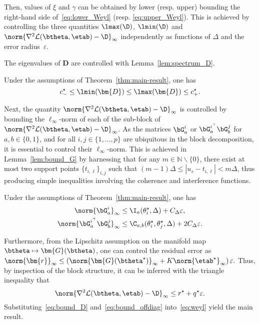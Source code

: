 \documentclass[conference,english,final,svgnames]{IEEEtran}
\begin{document}
Then, values of $\xi$ and $\gamma$ can be obtained by lower (resp. upper) bounding the right-hand side of~\eqref{eq:lower_Weyl} (resp. \eqref{eq:upper_Weyl}). This is achieved by controlling the three quantities $\lmax(\D)$, $\lmin(\D)$ and $\norm{\nabla^2 \mathcal{L}(\btheta, \etab) - \D}_{\infty}$ independently as functions of $\Delta$ and the error radius~$\varepsilon$.


The eigenvalues of $\bm{D}$ are controlled with Lemma~\ref{lem:spectrum_D}.
\begin{lemma}\label{lem:spectrum_D}
Under the assumptions of Theorem~\ref{thm:main-result}, one has
\begin{equation}\label{eq:bound_D}
        c_-^\star \leq \lmin(\bm{D}) \leq \lmax(\bm{D})  \leq c_+^\star.
\end{equation}
\end{lemma}
Next, the quantity $\norm{\nabla^2 \mathcal{L}(\btheta, \etab) - \D}_{\infty}$ is controlled by bounding the $\ell_{\infty}$-norm of each of the sub-block of $\norm{\nabla^2 \mathcal{L}(\btheta, \etab) - \D}_{\infty}$. As the matrices $\bG^i_a$ or $\bG_a^{i^{\top}}\bG_b^j$ for $a,b \in \{0,1\}$, and for all $i,j \in \{1,\dots, p\}$ are ubiquitous in the block decomposition, it is essential to control their $\ell_\infty$-norm. This is achieved in Lemma~\ref{lem:bound_G} by harnessing that for any $m\in \mathbb{N}\backslash\{0\}$, there exist at most two support points $\{t_{i,\ell}\}_{i,j}$ such that $(m-1)\Delta \leq |u_s - t_{i,\ell}| < m\Delta$, thus producing simple inequalities involving the coherence and interference functions.
\begin{lemma}\label{lem:bound_G}Under the assumptions of Theorem~\ref{thm:main-result}, one has
    \begin{subequations}\label{eq:bound_G}
    \begin{align}\label{eq:calc_interference}
    \norm{\bG^i_a}_{\infty} 
    &\leq \I_a(\theta_i^\star, \Delta) + C_\Delta \varepsilon, \\
    \norm{\bG_a^{i^{\top}}\bG_b^j}_{\infty}
    &\leq \C_{a,b}(\theta_i^\star, \theta_j^\star, \Delta) + 2 C_\Delta \varepsilon. \label{eq:calc_coherence}
\end{align}
\end{subequations}
\end{lemma}
Furthermore, from the Lipschitz assumption on the manifold map $\btheta \mapsto \bm{G}(\btheta)$, one can control the residual error as
\(
    \norm{\bm{r}}_\infty \leq \left(\norm{\bm{G}(\btheta^\star)}_\infty  + K \norm{\etab^\star}_\infty \right) \varepsilon.
\)
Thus, by inspection of the block structure, it can be inferred with the triangle inequality that
\begin{equation}\label{eq:bound_offdiag}
    \norm{\nabla^2 \mathcal{L}(\btheta, \etab) - \D}_{\infty} \leq r^\star + q^\star \varepsilon.
\end{equation}
Substituting~\eqref{eq:bound_D} and~\eqref{eq:bound_offdiag} into~\eqref{eq:weyl} yield the main result. \IEEEQEDhere
\end{document}
